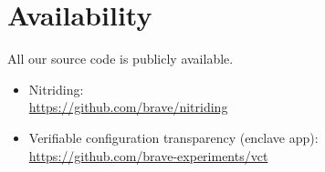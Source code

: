 \section*{Availability}

All our source code is publicly available.

\begin{itemize}
  \item Nitriding: \\
    {\small \url{https://github.com/brave/nitriding}}

  \item Verifiable configuration transparency (enclave app):\\
    {\small \url{https://github.com/brave-experiments/vct}}
\end{itemize}
